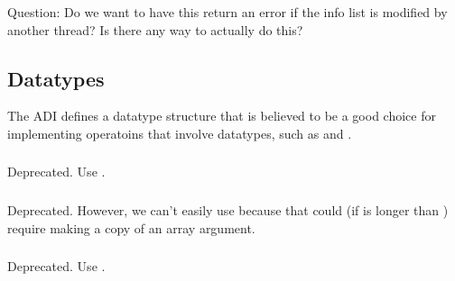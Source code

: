 \documentclass{article}
\begin{document}
\subsubsection{}
\subsubsection{}
\subsubsection{}
Question:  Do we want to have this return an error if the info list is 
modified by another thread?  Is there any way to actually do this?

\subsubsection{}
\subsubsection{}


\subsection{Datatypes}
The ADI defines a datatype structure that is believed to be a good
choice for implementing operatoins that involve datatypes, such as
 and .

\subsubsection{}
Deprecated.  Use .
\subsubsection{}
Deprecated.  However, we can't easily use 
because that could (if  is longer than ) require
making a copy of an array argument.

\subsubsection{}
Deprecated.  Use .
\end{document}
